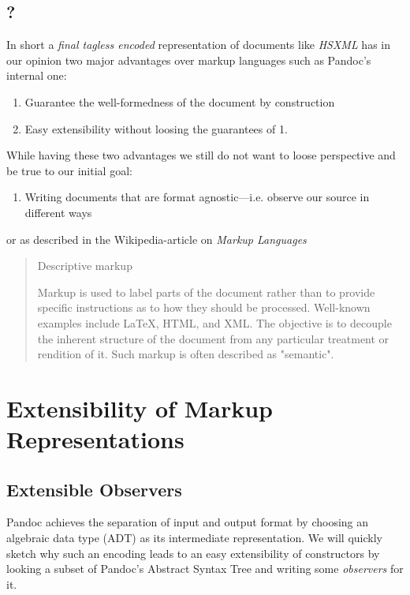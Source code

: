 \subsection{?}

In short a \emph{final tagless encoded} representation of documents like
\emph{HSXML} has in our opinion two major advantages over markup languages such
as Pandoc’s internal one:

\begin{enumerate}
\item Guarantee the well-formedness of the document by construction
\item Easy extensibility without loosing the guarantees of 1.
\end{enumerate}

While having these two advantages we still do not want to loose perspective and
be true to our initial goal:

\begin{enumerate}
\item Writing documents that are format agnostic—i.e. observe our source in
different ways
\end{enumerate}

or as described in the Wikipedia-article on \emph{Markup Languages}

\begin{quote}
Descriptive markup

Markup is used to label parts of the document rather than to provide specific
instructions as to how they should be processed. Well-known examples include
\LaTeX{}, HTML, and XML. The objective is to decouple the inherent structure of
the document from any particular treatment or rendition of it. Such markup is
often described as "semantic".
\end{quote}

\section{Extensibility of Markup Representations}
\label{sec:org7537ecb}
\subsection{Extensible Observers}
\label{sec:org5f9818b}

Pandoc achieves the separation of input and output format by choosing an
algebraic data type (ADT) as its intermediate representation. We will quickly
sketch why such an encoding leads to an easy extensibility of constructors by
looking a subset of Pandoc's Abstract Syntax Tree and writing some
\emph{observers} for it.

